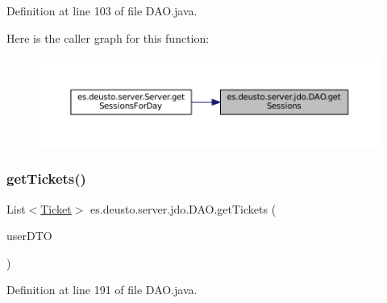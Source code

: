 Definition at line 103 of file D\+A\+O.\+java.

Here is the caller graph for this function\+:
\nopagebreak
\begin{figure}[H]
\begin{center}
\leavevmode
\includegraphics[width=350pt]{classes_1_1deusto_1_1server_1_1jdo_1_1_d_a_o_a2f9f9eb5adc37f559d7fefe2da6544f1_icgraph}
\end{center}
\end{figure}
\mbox{\label{classes_1_1deusto_1_1server_1_1jdo_1_1_d_a_o_a7bbfb6c3ed916f93425081d4a24ec6ea}} 
\subsubsection{\texorpdfstring{getTickets()}{getTickets()}}
{\footnotesize\ttfamily List$<$\mbox{\hyperlink{classes_1_1deusto_1_1server_1_1jdo_1_1_ticket}{Ticket}}$>$ es.\+deusto.\+server.\+jdo.\+D\+A\+O.\+get\+Tickets (\begin{DoxyParamCaption}\item[{\mbox{\hyperlink{classes_1_1deusto_1_1server_1_1data_1_1_user_d_t_o}{User\+D\+TO}}}]{user\+D\+TO }\end{DoxyParamCaption})}



Definition at line 191 of file D\+A\+O.\+java.

